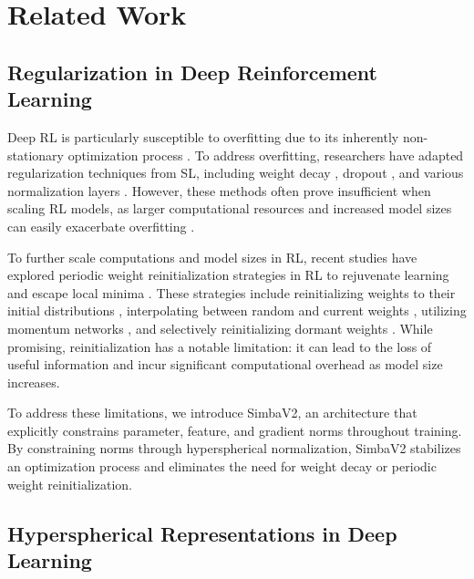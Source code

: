 \section{Related Work}
\subsection{Regularization in Deep Reinforcement Learning}

Deep RL is particularly susceptible to overfitting due to its inherently non-stationary optimization process \citep{song2019observational}. To address overfitting, researchers have adapted regularization techniques from SL, including weight decay \citep{farebrother2018l2rl}, dropout \citep{hiraoka2021dropout}, and various normalization layers \citep{gogianu2021spectral, bjorck2021spectralnormRL, lyle2023understanding_plasticity, gallici2024simplifying_td, bhatt2024crossq, lee2024simba, elsayed2024streaming, palenicek2025scaling}. However, these methods often prove insufficient when scaling RL models, as larger computational resources and increased model sizes can easily exacerbate overfitting \citep{li2023efficient, nauman2024overestimation}.

To further scale computations and model sizes in RL, recent studies have explored periodic weight reinitialization strategies in RL to rejuvenate learning and escape local minima \citep{d2023sample_breaking, nauman2024bro}. 
These strategies include reinitializing weights to their initial distributions \citep{nikishin2022primacy}, interpolating between random and current weights \citep{xu2023drm, schwarzer2023bbf}, utilizing momentum networks \citep{lee2024slow}, and selectively reinitializing dormant weights \citep{sokar2023dormant}. 
While promising, reinitialization has a notable limitation: it can lead to the loss of useful information and incur significant computational overhead as model size increases.

To address these limitations, we introduce SimbaV2, an architecture that explicitly constrains parameter, feature, and gradient norms throughout training. By constraining norms through hyperspherical normalization, SimbaV2 stabilizes an optimization process and eliminates the need for weight decay or periodic weight reinitialization.


\subsection{Hyperspherical Representations in Deep Learning}

